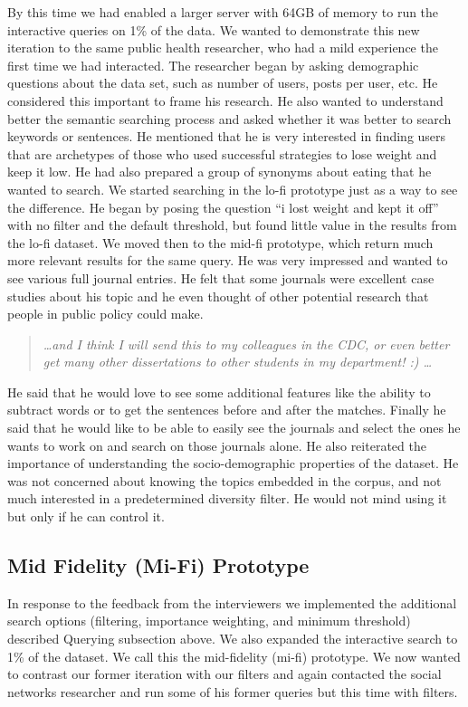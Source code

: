 \documentclass{sigchi}
\begin{document}
By this time we had enabled a larger server with  64GB of memory to run the interactive queries on 1\% of the data. We wanted to demonstrate this new iteration to the same public health researcher, who had a mild experience the first time we had interacted. 
The researcher began by asking demographic questions about the data set, such as number of users, posts per user, etc. He considered this important to frame his research. He also wanted to understand better the semantic searching process and asked whether it was better to search keywords or sentences. He mentioned that he is very interested in finding users that are archetypes of those who used successful strategies to lose weight and keep it low. He had also prepared a group of synonyms about eating that he wanted to search. We started searching in the lo-fi prototype just as a way to see the difference. He began by posing the question ``i lost weight and kept it off'' with no filter and the default threshold, but found little value in the results from the lo-fi dataset. We moved then to the mid-fi prototype, which return much more relevant results for the same query. He was very impressed and wanted to see various full journal entries. He felt that some journals were excellent case studies about his topic and he even thought of other potential research that people in public policy could make. 

\begin{quote}
{\em
\dots and I think I will send this to my colleagues in the CDC, or even better get many other dissertations to other students in my department! :) \dots
}\end{quote}

He said that he would love to see some additional features like the ability to subtract words or to get the sentences before and after the matches. Finally he said that he would like to be able to easily see the journals and select the ones he wants to work on and search on those journals alone. He also reiterated the importance of understanding the socio-demographic properties of the dataset. He was not concerned about knowing the topics embedded in the corpus, and not much interested in a predetermined diversity filter. He would not mind using it but only if he can control it.

\subsection{Mid Fidelity (Mi-Fi) Prototype}
In response to the feedback from the interviewers we implemented the additional search options (filtering, importance weighting, and minimum threshold) described Querying subsection above. We also expanded the interactive search to 1\% of the dataset. We call this the mid-fidelity (mi-fi) prototype. We now wanted to contrast our former iteration with our filters and again contacted the social networks researcher and run some of his former queries but this time with filters. 
\end{document}
